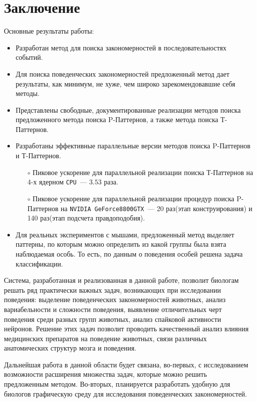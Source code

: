\documentclass[12pt,fсeqn]{article}
\begin{document}
\section{Заключение}
Основные результаты работы:
\begin{itemize}
 \item Разработан метод для поиска закономерностей в последовательностях событий.
 \item Для поиска поведенческих закономерностей
 предложенный метод дает результаты, как минимум, не хуже, чем широко зарекомендовавшие себя методы.
 \item Представлены свободные, документированные реализации методов
поиска предложенного метода поиска P-Паттернов, а также метода поиска Т-Паттернов. 
\item Разработаны эффективные параллельные версии методов поиска P-Паттернов и Т-Паттернов.
\begin{itemize}
\item[$\circ$]
Пиковое ускорение для параллельной реализации поиска Т-Паттернов на 4-х ядерном \verb!CPU!~--- $3.53$ раза.
\item[$\circ$]
Пиковое ускорение для параллельной реализации процедур поиска P-Паттернов на \verb!NVIDIA GeForce8800GTX!~--- 
20 раз(этап конструирования) и 140 раз(этап подсчета правдоподобия).
\end{itemize}
\item 
Для реальных экспериментов с мышами, предложенный метод
выделяет паттерны, по которым можно определить из какой
группы была взята наблюдаемая особь. То есть, по данным о поведения особей решена задача классификации.
\end{itemize}

Система, разработанная и реализованная в данной работе, позволит биологам решать ряд практически
важных задач, возникающих при исследовании поведения: выделение поведенческих закономерностей
животных, анализ вариабельности и сложности поведения, выявление отличительных черт поведения среди разных групп 
животных, анализ спайковой активности нейронов. 
Решение этих задач позволит проводить качественный анализ влияния медицинских препаратов на поведение животных, 
связи различных анатомических структур мозга и поведения.

Дальнейшая работа в данной области будет связана, во-первых, с исследованием возможности 
расширения множества задач, которые можно решить предложенным методом. Во-вторых, планируется
разработать удобную для биологов графическую среду для исследования поведенческих закономерностей.
\end{document}
